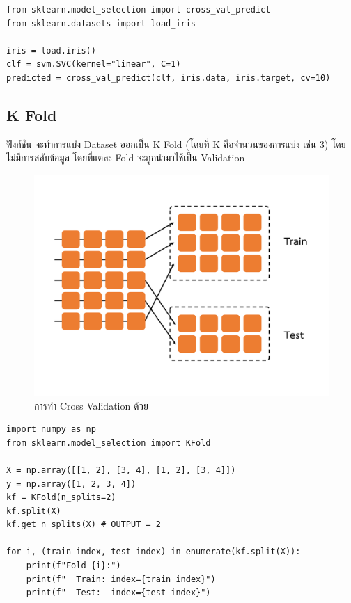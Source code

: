\begin{lstlisting}[style=MyPython]
from sklearn.model_selection import cross_val_predict
from sklearn.datasets import load_iris

iris = load.iris()
clf = svm.SVC(kernel="linear", C=1)
predicted = cross_val_predict(clf, iris.data, iris.target, cv=10)
\end{lstlisting}

\subsection{K Fold}
\label{ssec:f_fold}

ฟังก์ชัน  จะทำการแบ่ง Dataset ออกเป็น K Fold (โดยที่ K คือจำนวนของการแบ่ง เช่น 3) โดยไม่มีการสลับข้อมูล 
โดยที่แต่ละ Fold จะถูกนำมาใช้เป็น Validation

\begin{figure}[H]
    \centering
    \includegraphics[width=0.9\linewidth,page=4]{fig/cross_validation.pdf}
    \caption{การทำ Cross Validation ด้วย }
    \label{fig:f_fold}
\end{figure}

\begin{lstlisting}[style=MyPython]
import numpy as np
from sklearn.model_selection import KFold

X = np.array([[1, 2], [3, 4], [1, 2], [3, 4]])
y = np.array([1, 2, 3, 4])
kf = KFold(n_splits=2)
kf.split(X)
kf.get_n_splits(X) # OUTPUT = 2

for i, (train_index, test_index) in enumerate(kf.split(X)):
    print(f"Fold {i}:")
    print(f"  Train: index={train_index}")
    print(f"  Test:  index={test_index}")
\end{lstlisting}

